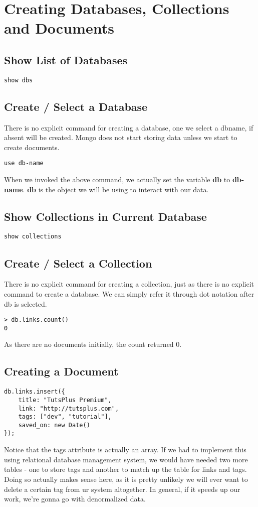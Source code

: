\documentclass[a4paper, 12pt]{article}
\begin{document}
\section{Creating Databases, Collections and Documents}
\subsection{Show List of Databases}
\begin{verbatim}
show dbs
\end{verbatim}
\subsection{Create / Select a Database}
There is no explicit command for creating a database, one we select a dbname, if absent will be created. Mongo does not start storing data unless we start to create documents.
\begin{verbatim}
use db-name
\end{verbatim}
When we invoked the above command, we actually set the variable \textbf{db} to \textbf{db-name}. \textbf{db} is the object we will be using to interact with our data.
\subsection{Show Collections in Current Database}
\begin{verbatim}
show collections
\end{verbatim}
\subsection{Create / Select a Collection}
There is no explicit command for creating a collection, just as there is no explicit command to create a database. We can simply refer it through dot notation after db is selected.
\begin{verbatim}
> db.links.count()
0
\end{verbatim}
As there are no documents initially, the count returned 0.
\subsection{Creating a Document}
\begin{verbatim}
db.links.insert({
    title: "TutsPlus Premium",
    link: "http://tutsplus.com",
    tags: ["dev", "tutorial"],
    saved_on: new Date()
});
\end{verbatim}
Notice that the tags attribute is actually an array. If we had to implement this using relational database management system, we would have needed two more tables - one to store tags and another to match up the table for links and tags. Doing so actually makes sense here, as it is pretty unlikely we will ever want to delete a certain tag from ur system altogether. In general, if it speeds up our work, we're gonna go with denormalized data.
\end{document}
